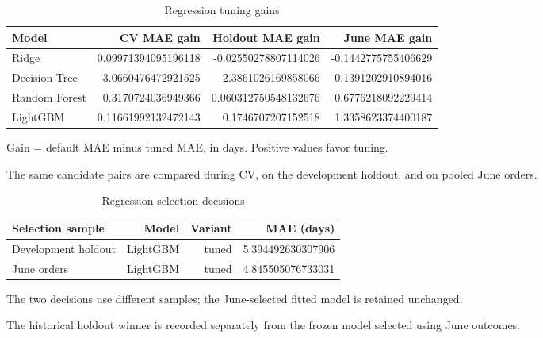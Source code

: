 \begin{table}[htbp]
\centering
\small
\caption{Regression tuning gains}
\begin{tabular}{lrrr}
\toprule
Model & CV MAE gain & Holdout MAE gain & June MAE gain \\
\midrule
Ridge & 0.09971394095196118 & -0.02550278807114026 & -0.1442775755406629 \\
Decision Tree & 3.0660476472921525 & 2.3861026169858066 & 0.1391202910894016 \\
Random Forest & 0.3170724036949366 & 0.060312750548132676 & 0.6776218092229414 \\
LightGBM & 0.11661992132472143 & 0.1746707207152518 & 1.3358623374400187 \\
\bottomrule
\end{tabular}
\par\smallskip\begin{minipage}{\linewidth}\footnotesize Gain = default MAE minus tuned MAE, in days. Positive values favor tuning.\end{minipage}
\end{table}
The same candidate pairs are compared during CV, on the development holdout, and on pooled June orders.

\begin{table}[htbp]
\centering
\small
\caption{Regression selection decisions}
\begin{tabular}{lrrr}
\toprule
Selection sample & Model & Variant & MAE (days) \\
\midrule
Development holdout & LightGBM & tuned & 5.394492630307906 \\
June orders & LightGBM & tuned & 4.845505076733031 \\
\bottomrule
\end{tabular}
\par\smallskip\begin{minipage}{\linewidth}\footnotesize The two decisions use different samples; the June-selected fitted model is retained unchanged.\end{minipage}
\end{table}
The historical holdout winner is recorded separately from the frozen model selected using June outcomes.

